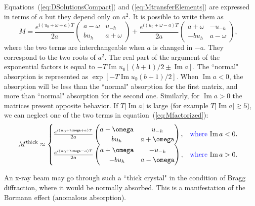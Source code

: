\documentclass[preprint]{iucr}              %
\newcommand{\inblue}[1]{{\color{blue}#1}}
\newcommand{\inred}[1]{{\color{red}#1}}
\begin{document}
Equations~(\ref{eq:DSolutionsCompact}) and (\ref{eq:MtransferElements}) are expressed in terms of $a$ but they depend only on $a^2$.
It is possible to write them as 
\begin{equation}\label{eq:Mfactorized}
    M =
    \frac{e^{i(u_0+\omega+a)T}}{2a}
    \begin{pmatrix}
    a-\omega & u_{-h}\\
    b u_h & a + \omega
    \end{pmatrix}
    + 
    \frac{e^{i(u_0+\omega-a)T}}{2a}
    \begin{pmatrix}
    a+\omega & -u_{-h}\\
    -b u_h & a - \omega
    \end{pmatrix}, 
\end{equation}
where the two terms are interchangeable when $a$ is changed in $-a$. They correspond to the two roots of $a^2$. The real part of the argument of the exponential factors is equal to $-T \operatorname{Im} u_0 [(b+1)/2  \pm \operatorname{Im} a]$.
\inblue{
The ``normal" absorption is represented as $\exp[-T \operatorname{Im} u_0 (b+1)/2 ]$.
When $\operatorname{Im}a<0$,
the absorption will be less than the ``normal" absorption for the first matrix, and more than ``normal" absorption for the second one. Similarly, for  $\operatorname{Im}a>0$ the matrices present opposite behavior.  If $T |\operatorname{Im}a|$ is large (for example $T |\operatorname{Im}a|  \gtrsim 5$), we can neglect one of the two terms in equation~(\ref{eq:Mfactorized}):
}
\begin{equation}\label{eq:Mthickapprox}
    M^{\text{thick}} \approx \begin{cases} 
    \frac{e^{i(u_0+\omega+a)T}}{2a}
    \begin{pmatrix}
    a-\omega & u_{-h}\\
    b u_h & a + \omega
    \end{pmatrix}, & \text{\inblue{where} $\operatorname{Im}a<0$}.\\
    
    \frac{e^{i(u_0+\omega-a)T}}{2a}
    \begin{pmatrix}
    a+\omega & -u_{-h}\\
    -b u_h & a - \omega
    \end{pmatrix}, & \text{\inblue{where} $\operatorname{Im}a>0$}.
    \end{cases}
\end{equation} 

\inred{An x-ray beam may go through such a ``thick crystal" in the condition of Bragg diffraction, where it would be normally absorbed.} This is a manifestation of the Bormann effect (anomalous absorption).
\end{document}

